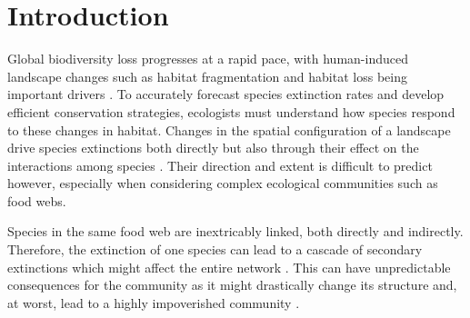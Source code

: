 \documentclass[11pt]{article}
\begin{document}
\begin{abstract}
  \noindent \normalsize We develop a novel approach to analyzing trophic metacommunities, which allows us to explore how progressive habitat loss affects food webs. Our method combines classic metapopulation models on fragmented landscapes with a Bayesian network representation of trophic interactions for calculating local extinction rates. This means we can repurpose known results from classic metapopulation theory for trophic metacommunities, such as ranking the habitat patches of the landscape with respect to their importance to the persistence of the metacommunity as a whole. We use this to study the effects of habitat loss, both on model communities and the plant-mammal Serengeti food web dataset as a case study. Combining straightforward parameterizability with computational efficiency, our method permits the analysis of species-rich food webs over large landscapes, with hundreds or even thousands of species and habitat patches, while still retaining much of the flexibility of explicit dynamical models.
\end{abstract}


\section{Introduction} \label{sec:intro}

Global biodiversity loss progresses at a rapid pace, with human-induced landscape changes such as habitat fragmentation and habitat loss being important drivers \citep{Tylianakis2008, Haddad2015}. To accurately forecast species extinction rates and develop efficient conservation strategies, ecologists must understand how species respond to these changes in habitat. Changes in the spatial configuration of a landscape drive species extinctions both directly but also through their effect on the interactions among species \citep{Tylianakis2008, Valiente-Banuet2015}. Their direction and extent is difficult to predict however, especially when considering complex ecological communities such as food webs.

Species in the same food web are inextricably linked, both directly and indirectly. Therefore, the extinction of one species can lead to a cascade of secondary extinctions which might affect the entire network \citep{EbenmanJonsson2005, Dunne2009}. This can have unpredictable consequences for the community as it might drastically change its structure and, at worst, lead to a highly impoverished community \citep{EklofEbenman2006, Dunne2009}.
\end{document}
